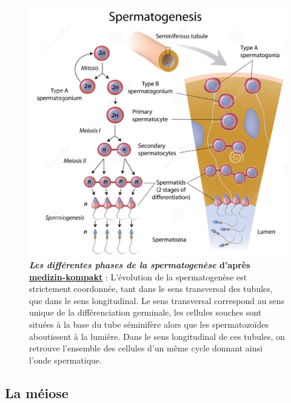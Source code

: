 \documentclass[12pt,a4paper,twoside]{ugathesis}
\theoremstyle{definition}
\theoremstyle{definition}
\theoremstyle{definition}
\theoremstyle{remark}
\begin{document}
\begin{figure}

{\centering \includegraphics[scale=0.35]{figure/spermatogenese2} 

}

\caption[Les différentes phases de la spermatogenèse]{\textbf{\emph{Les différentes phases de la
spermatogenèse} d'après
\href{http://www.medizin-kompakt.de/spermatogenese}{medizin-kompakt}} :
L'évolution de la spermatogenèse est strictement coordonnée, tant dans
le sens transversal des tubules, que dans le sens longitudinal. Le sens
transversal correspond au sens unique de la différenciation germinale,
les cellules souches sont situées à la base du tube séminifère alors que
les spermatozoïdes aboutissent à la lumière. Dans le sens longitudinal
de ces tubules, on retrouve l'ensemble des cellules d'un même cycle
donnant ainsi l'onde spermatique.}\label{fig:spermatogenese}
\end{figure}












\newpage 

\hypertarget{meiose}{\subsection{La méiose}\label{meiose}}
\end{document}
